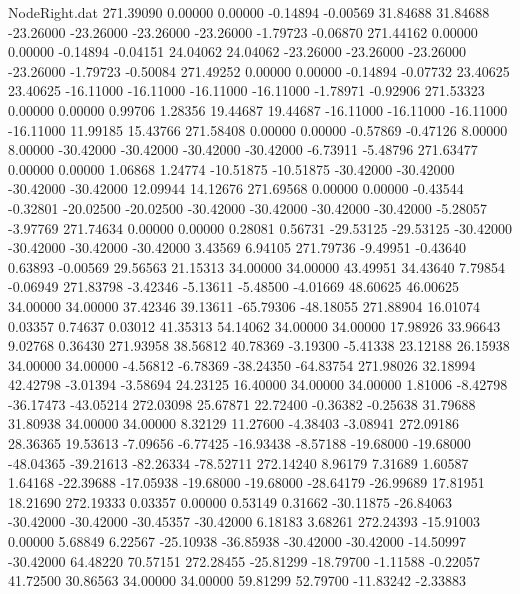 \begin{filecontents}{NodeRight.dat}
 271.39090    0.00000    0.00000    -0.14894   -0.00569   31.84688   31.84688  -23.26000  -23.26000  -23.26000  -23.26000   -1.79723   -0.06870
 271.44162    0.00000    0.00000    -0.14894   -0.04151   24.04062   24.04062  -23.26000  -23.26000  -23.26000  -23.26000   -1.79723   -0.50084
 271.49252    0.00000    0.00000    -0.14894   -0.07732   23.40625   23.40625  -16.11000  -16.11000  -16.11000  -16.11000   -1.78971   -0.92906
 271.53323    0.00000    0.00000     0.99706    1.28356   19.44687   19.44687  -16.11000  -16.11000  -16.11000  -16.11000   11.99185   15.43766
 271.58408    0.00000    0.00000    -0.57869   -0.47126    8.00000    8.00000  -30.42000  -30.42000  -30.42000  -30.42000   -6.73911   -5.48796
 271.63477    0.00000    0.00000     1.06868    1.24774  -10.51875  -10.51875  -30.42000  -30.42000  -30.42000  -30.42000   12.09944   14.12676
 271.69568    0.00000    0.00000    -0.43544   -0.32801  -20.02500  -20.02500  -30.42000  -30.42000  -30.42000  -30.42000   -5.28057   -3.97769
 271.74634    0.00000    0.00000     0.28081    0.56731  -29.53125  -29.53125  -30.42000  -30.42000  -30.42000  -30.42000    3.43569    6.94105
 271.79736   -9.49951   -0.43640     0.63893   -0.00569   29.56563   21.15313   34.00000   34.00000   43.49951   34.43640    7.79854   -0.06949
 271.83798   -3.42346   -5.13611    -5.48500   -4.01669   48.60625   46.00625   34.00000   34.00000   37.42346   39.13611  -65.79306  -48.18055
 271.88904   16.01074    0.03357     0.74637    0.03012   41.35313   54.14062   34.00000   34.00000   17.98926   33.96643    9.02768    0.36430
 271.93958   38.56812   40.78369    -3.19300   -5.41338   23.12188   26.15938   34.00000   34.00000   -4.56812   -6.78369  -38.24350  -64.83754
 271.98026   32.18994   42.42798    -3.01394   -3.58694   24.23125   16.40000   34.00000   34.00000    1.81006   -8.42798  -36.17473  -43.05214
 272.03098   25.67871   22.72400    -0.36382   -0.25638   31.79688   31.80938   34.00000   34.00000    8.32129   11.27600   -4.38403   -3.08941
 272.09186   28.36365   19.53613    -7.09656   -6.77425  -16.93438   -8.57188  -19.68000  -19.68000  -48.04365  -39.21613  -82.26334  -78.52711
 272.14240    8.96179    7.31689     1.60587    1.64168  -22.39688  -17.05938  -19.68000  -19.68000  -28.64179  -26.99689   17.81951   18.21690
 272.19333    0.03357    0.00000     0.53149    0.31662  -30.11875  -26.84063  -30.42000  -30.42000  -30.45357  -30.42000    6.18183    3.68261
 272.24393  -15.91003    0.00000     5.68849    6.22567  -25.10938  -36.85938  -30.42000  -30.42000  -14.50997  -30.42000   64.48220   70.57151
 272.28455  -25.81299  -18.79700    -1.11588   -0.22057   41.72500   30.86563   34.00000   34.00000   59.81299   52.79700  -11.83242   -2.33883

\end{filecontents}
